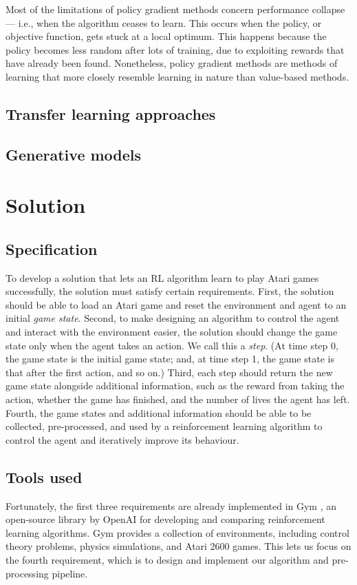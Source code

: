 \documentclass[12pt,a4paper]{article}
\begin{document}
Most of the limitations of policy gradient methods concern performance collapse --- i.e., when the algorithm ceases to learn. This occurs when the policy, or objective function, gets stuck at a local optimum. This happens because the policy becomes less random after lots of training, due to exploiting rewards that have already been found. Nonetheless, policy gradient methods are methods of learning that more closely resemble learning in nature than value-based methods.

\subsection{Transfer learning approaches}

\subsection{Generative models}

\newpage
\section{Solution}
\subsection{Specification}
To develop a solution that lets an RL algorithm learn to play Atari games successfully, the solution must satisfy certain requirements. First, the solution should be able to load an Atari game and reset the environment and agent to an initial \emph{game state}. Second, to make designing an algorithm to control the agent and interact with the environment easier, the solution should change the game state only when the agent takes an action. We call this a \emph{step}. (At time step 0, the game state is the initial game state; and, at time step 1, the game state is that after the first action, and so on.) Third, each step should return the new game state alongside additional information, such as the reward from taking the action, whether the game has finished, and the number of lives the agent has left. Fourth, the game states and additional information should be able to be collected, pre-processed, and used by a reinforcement learning algorithm to control the agent and iteratively improve its behaviour.

\subsection{Tools used}
Fortunately, the first three requirements are already implemented in Gym \cite{1606.01540}, an open-source library by OpenAI for developing and comparing reinforcement learning algorithms. Gym provides a collection of environments, including control theory problems, physics simulations, and Atari 2600 games. This lets us focus on the fourth requirement, which is to design and implement our algorithm and pre-processing pipeline.
\end{document}
